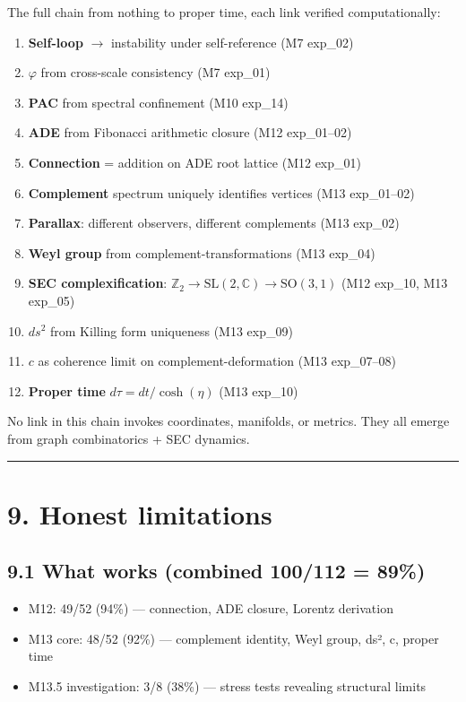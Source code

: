 \documentclass[11pt,a4paper]{article}
\providecommand{\tightlist}{\setlength{\itemsep}{0pt}\setlength{\parskip}{0pt}}
\begin{document}
The full chain from nothing to proper time, each link verified computationally:

\begin{enumerate}\tightlist
\item \textbf{Self-loop} $\to$ instability under self-reference (M7 exp\_02)
\item \textbf{$\varphi$} from cross-scale consistency (M7 exp\_01)
\item \textbf{PAC} from spectral confinement (M10 exp\_14)
\item \textbf{ADE} from Fibonacci arithmetic closure (M12 exp\_01–02)
\item \textbf{Connection} = addition on ADE root lattice (M12 exp\_01)
\item \textbf{Complement} spectrum uniquely identifies vertices (M13 exp\_01–02)
\item \textbf{Parallax}: different observers, different complements (M13 exp\_02)
\item \textbf{Weyl group} from complement-transformations (M13 exp\_04)
\item \textbf{SEC complexification}: $\mathbb{Z}_2 \to \text{SL}(2,\mathbb{C}) \to \text{SO}(3,1)$ (M12 exp\_10, M13 exp\_05)
\item \textbf{$ds^2$} from Killing form uniqueness (M13 exp\_09)
\item \textbf{$c$} as coherence limit on complement-deformation (M13 exp\_07–08)
\item \textbf{Proper time} $d\tau = dt/\cosh(\eta)$ (M13 exp\_10)
\end{enumerate}

No link in this chain invokes coordinates, manifolds, or metrics. They all emerge from graph combinatorics + SEC dynamics.

\begin{center}\rule{0.5\linewidth}{0.4pt}\end{center}

\section*{9. Honest limitations}

\subsection*{9.1 What works (combined 100/112 = 89\%)}

\begin{itemize}\tightlist
\item M12: 49/52 (94\%) — connection, ADE closure, Lorentz derivation
\item M13 core: 48/52 (92\%) — complement identity, Weyl group, ds², c, proper time
\item M13.5 investigation: 3/8 (38\%) — stress tests revealing structural limits
\end{itemize}
\end{document}
